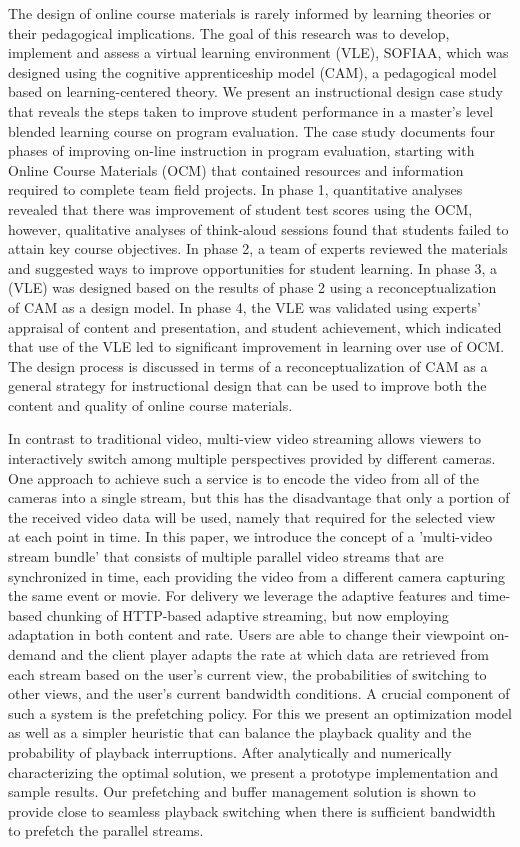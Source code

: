 The design of online course materials is rarely informed by learning theories or their pedagogical implications. The goal of this research was to develop, implement and assess a virtual learning environment (VLE), SOFIAA, which was designed using the cognitive apprenticeship model (CAM), a pedagogical model based on learning-centered theory. We present an instructional design case study that reveals the steps taken to improve student performance in a master’s level blended learning course on program evaluation. The case study documents four phases of improving on-line instruction in program evaluation, starting with Online Course Materials (OCM) that contained resources and information required to complete team field projects. In phase 1, quantitative analyses revealed that there was improvement of student test scores using the OCM, however, qualitative analyses of think-aloud sessions found that students failed to attain key course objectives. In phase 2, a team of experts reviewed the materials and suggested ways to improve opportunities for student learning. In phase 3, a (VLE) was designed based on the results of phase 2 using a reconceptualization of CAM as a design model. In phase 4, the VLE was validated using experts’ appraisal of content and presentation, and student achievement, which indicated that use of the VLE led to significant improvement in learning over use of OCM. The design process is discussed in terms of a reconceptualization of CAM as a general strategy for instructional design that can be used to improve both the content and quality of online course materials.\cite{Garcia-Cabrero2018}



In contrast to traditional video, multi-view video streaming allows viewers to interactively switch among multiple perspectives provided by different cameras. One approach to achieve such a service is to encode the video from all of the cameras into a single stream, but this has the disadvantage that only a portion of the received video data will be used, namely that required for the selected view at each point in time. In this paper, we introduce the concept of a 'multi-video stream bundle' that consists of multiple parallel video streams that are synchronized in time, each providing the video from a different camera capturing the same event or movie. For delivery we leverage the adaptive features and time-based chunking of HTTP-based adaptive streaming, but now employing adaptation in both content and rate. Users are able to change their viewpoint on-demand and the client player adapts the rate at which data are retrieved from each stream based on the user's current view, the probabilities of switching to other views, and the user's current bandwidth conditions. A crucial component of such a system is the prefetching policy. For this we present an optimization model as well as a simpler heuristic that can balance the playback quality and the probability of playback interruptions. After analytically and numerically characterizing the optimal solution, we present a prototype implementation and sample results. Our prefetching and buffer management solution is shown to provide close to seamless playback switching when there is sufficient bandwidth to prefetch the parallel streams.\cite{Carlsson2017}


